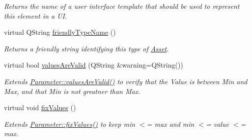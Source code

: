 \begin{DoxyCompactItemize}
\begin{DoxyCompactList}\small\item\em Returns the name of a user interface template that should be used to represent this element in a U\-I. \end{DoxyCompactList}\item 
virtual Q\-String \hyperlink{class_picto_1_1_range_parameter_a916973a7766df58640dcaab22756603b}{friendly\-Type\-Name} ()
\begin{DoxyCompactList}\small\item\em Returns a friendly string identifying this type of \hyperlink{class_picto_1_1_asset}{Asset}. \end{DoxyCompactList}\item 
virtual bool \hyperlink{class_picto_1_1_range_parameter_ae3cc4ca911228b69fa2808e838913d59}{values\-Are\-Valid} (Q\-String \&warning=Q\-String())
\begin{DoxyCompactList}\small\item\em Extends \hyperlink{class_picto_1_1_parameter_a3443808da4c3edf26f2c3c3772d95b10}{Parameter\-::values\-Are\-Valid()} to verify that the Value is between Min and Max, and that Min is not greatner than Max. \end{DoxyCompactList}\item 
virtual void \hyperlink{class_picto_1_1_range_parameter_a7d3286c6f2fc89604be66fe7314277f1}{fix\-Values} ()
\begin{DoxyCompactList}\small\item\em Extends \hyperlink{class_picto_1_1_parameter_a219dc74f193fc0f25e813275a945b822}{Parameter\-::fix\-Values()} to keep min $<$= max and min $<$= value $<$= max. \end{DoxyCompactList}\end{DoxyCompactItemize}
